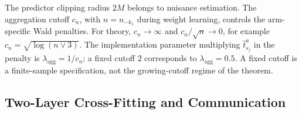 \documentclass[12pt]{article}
\begin{document}
\begin{remark}\label{rem:finite_sample_wald_cutoff}
The predictor clipping radius $2M$ belongs to nuisance estimation. The aggregation cutoff $c_n$, with $n=n_{-k_1}$ during weight learning, controls the arm-specific Wald penalties. For theory, $c_n\to\infty$ and $c_n/\sqrt n\to0$, for example $c_n=\sqrt{\log(n\vee3)}$. The implementation parameter multiplying $\widehat t_{s_j}^a$ in the penalty is $\lambda_{\mathrm{agg}}=1/c_n$; a fixed cutoff $2$ corresponds to $\lambda_{\mathrm{agg}}=0.5$. A fixed cutoff is a finite-sample specification, not the growing-cutoff regime of the theorem.
\end{remark}

\subsection{Two-Layer Cross-Fitting and Communication}\label{sec:algorithms}
\end{document}
